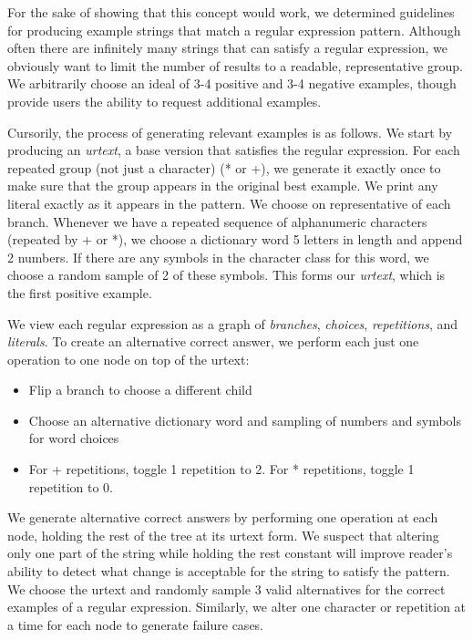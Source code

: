 For the sake of showing that this concept would work, we determined guidelines for producing example strings that match a regular expression pattern.
Although often there are infinitely many strings that can satisfy a regular expression, we obviously want to limit the number of results to a readable, representative group.
We arbitrarily choose an ideal of 3-4 positive and 3-4 negative examples, though provide users the ability to request additional examples.

Cursorily, the process of generating relevant examples is as follows.
We start by producing an \emph{urtext}, a base version that satisfies the regular expression.
For each repeated group (not just a character) (* or +), we generate it exactly once to make sure that the group appears in the original best example.
We print any literal exactly as it appears in the pattern.
We choose on representative of each branch.
Whenever we have a repeated sequence of alphanumeric characters (repeated by + or *), we choose a dictionary word 5 letters in length and append 2 numbers.
If there are any symbols in the character class for this word, we choose a random sample of 2 of these symbols.
This forms our \emph{urtext}, which is the first positive example.

We view each regular expression as a graph of \emph{branches}, \emph{choices}, \emph{repetitions}, and \emph{literals}.
To create an alternative correct answer, we perform each just one operation to one node on top of the urtext:
\begin{itemize}
\item Flip a branch to choose a different child
\item Choose an alternative dictionary word and sampling of numbers and symbols for word choices
\item For + repetitions, toggle 1 repetition to 2.  For * repetitions, toggle 1 repetition to 0.
\end{itemize}

We generate alternative correct answers by performing one operation at each node, holding the rest of the tree at its urtext form.
We suspect that altering only one part of the string while holding the rest constant will improve reader's ability to detect what change is acceptable for the string to satisfy the pattern.
We choose the urtext and randomly sample 3 valid alternatives for the correct examples of a regular expression.
Similarly, we alter one character or repetition at a time for each node to generate failure cases.

